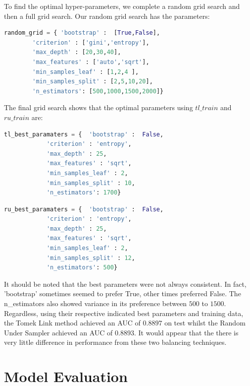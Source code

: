 \documentclass[11pt, oneside]{article}   	%
\begin{document}
To find the optimal hyper-parameters, we complete a random grid search and then a full grid search. 
Our random grid search has the parameters:
\begin{lstlisting}[language=Python]
random_grid = { 'bootstrap' :  [True,False],
		'criterion' : ['gini','entropy'],
		'max_depth' : [20,30,40],
		'max_features' : ['auto','sqrt'],
		'min_samples_leaf' : [1,2,4 ],
		'min_samples_split' : [2,5,10,20],
		'n_estimators': [500,1000,1500,2000]}
\end{lstlisting}

The final grid search shows that the optimal parameters using $tl\_train$ and $ru\_train$ are:
\begin{lstlisting}[language=Python]
tl_best_paramaters = {  'bootstrap' :  False,
			'criterion' : 'entropy',
			'max_depth' : 25,
			'max_features' : 'sqrt',
			'min_samples_leaf' : 2,
			'min_samples_split' : 10,
			'n_estimators': 1700}
\end{lstlisting}

\begin{lstlisting}[language=Python]
ru_best_paramaters = {  'bootstrap' :  False,
			'criterion' : 'entropy',
			'max_depth' : 25,
			'max_features' : 'sqrt',
			'min_samples_leaf' : 2,
			'min_samples_split' : 12,
			'n_estimators': 500}
\end{lstlisting}
It should be noted that the best parameters were not always consistent. In fact, 'bootstrap' sometimes seemed to prefer True, other times preferred False. The n\_estimators also showed variance in its preference between $500$ to $1500$.
Regardless, using their respective indicated best parameters and training data, the Tomek Link method achieved an AUC of $0.8897$ on test whilst the Random Under Sampler achieved an AUC of $0.8893$. It would appear that the there is very little difference in performance from these two balancing techniques.

\section{Model Evaluation}
\end{document}
